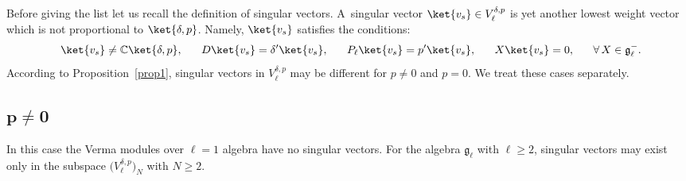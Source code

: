 Before giving the list let us recall the def\/inition of singular vectors.
A~singular vector $\ket{v_s} \in V^{\delta,p}_{\ell}$ is yet another lowest weight vector which is not proportional to
$\ket{\delta,p}$.
Namely, $ \ket{v_s} $ satisf\/ies the conditions:
\begin{gather}
    \ket{v_s} \neq {\mathbb C} \ket{\delta,p},
\qquad\!\!
    D \ket{v_s} = \delta' \ket{v_s},
\qquad\!\!
P_{\ell} \ket{v_s} = p' \ket{v_s},
\qquad\!\!
X \ket{v_s} = 0,
\qquad\!\!
\forall \,  X \in {\mathfrak g}_{\ell}^-.\!\!\!
\label{SV-def}
\end{gather}
According to Proposition~\ref{prop1}, singular vectors in $V^{\delta,p}_{\ell}$ may be dif\/ferent for $p \neq 0$ and
$p = 0$.
We treat these cases separately.

\subsection[$p \neq 0$]{$\boldsymbol{p \neq 0}$}

In this case the Verma modules over $ \ell = 1 $ algebra have no singular vectors.
For the algebra $ {\mathfrak g}_{\ell} $ with $ \ell \geq 2 $, singular vectors may exist only in the subspace $
\big(V^{\delta,p}_{\ell}\big)_N $ with $ N \geq 2$.
